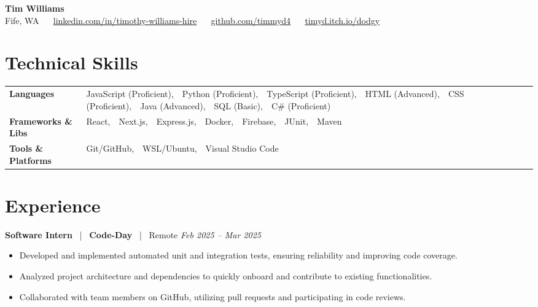 \documentclass[10pt, letterpaper]{article}
\newcommand{\jobhead}[4]{%
  \vspace{5pt}%
  {\bfseries\color{dark}#1}%
  ~{\color{light}|}~%
  {\bfseries\color{navy}#2}%
  ~{\color{light}|}~%
  {\color{light}#3}%
  \hfill{\color{light}\small\textit{#4}}\\[-2pt]%
}
\newcommand{\skillrow}[2]{%
  {\bfseries #1} & #2 \\[2pt]%
}
\begin{document}

\begin{center}
  {\huge\bfseries\color{navy} Tim Williams}\\[4pt]
  {\small\color{light}
    Fife, WA
    ~\textbullet~
    \href{https://linkedin.com/in/timothy-williams-hire}{linkedin.com/in/timothy-williams-hire}
    ~\textbullet~
    \href{https://github.com/timmyd4}{github.com/timmyd4}
    ~\textbullet~
    \href{https://timyd.itch.io/dodgy}{timyd.itch.io/dodgy}
  }
\end{center}

\vspace{2pt}

\section{Technical Skills}

\begin{tabular}{@{}p{1.6in} p{5.2in}@{}}
  \skillrow{Languages}{JavaScript (Proficient),\ \ Python (Proficient),\ \ TypeScript (Proficient),\ \ HTML (Advanced),\ \ CSS (Proficient),\ \ Java (Advanced),\ \ SQL (Basic),\ \ C\# (Proficient)}
  \skillrow{Frameworks \& Libs}{React,\ \ Next.js,\ \ Express.js,\ \ Docker,\ \ Firebase,\ \ JUnit,\ \ Maven}
  \skillrow{Tools \& Platforms}{Git/GitHub,\ \ WSL/Ubuntu,\ \ Visual Studio Code}
\end{tabular}

\section{Experience}

\jobhead{Software Intern}{Code-Day}{Remote}{Feb 2025 – Mar 2025}
\begin{itemize}
  \item Developed and implemented automated unit and integration tests, ensuring reliability and improving code coverage.
  \item Analyzed project architecture and dependencies to quickly onboard and contribute to existing functionalities.
  \item Collaborated with team members on GitHub, utilizing pull requests and participating in code reviews.
\end{itemize}
\end{document}
